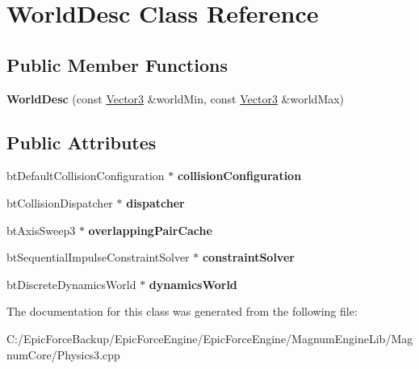 \hypertarget{class_world_desc}{}\section{World\+Desc Class Reference}
\label{class_world_desc}
\subsection*{Public Member Functions}
\begin{DoxyCompactItemize}
\item 
{\bfseries World\+Desc} (const \hyperlink{class_magnum_1_1_vector3}{Vector3} \&world\+Min, const \hyperlink{class_magnum_1_1_vector3}{Vector3} \&world\+Max)\hypertarget{class_world_desc_a2a513c20564b3b07770895d2018c9d57}{}\label{class_world_desc_a2a513c20564b3b07770895d2018c9d57}

\end{DoxyCompactItemize}
\subsection*{Public Attributes}
\begin{DoxyCompactItemize}
\item 
bt\+Default\+Collision\+Configuration $\ast$ {\bfseries collision\+Configuration}\hypertarget{class_world_desc_a180f1ad6c916ab8d14458c84f876592a}{}\label{class_world_desc_a180f1ad6c916ab8d14458c84f876592a}

\item 
bt\+Collision\+Dispatcher $\ast$ {\bfseries dispatcher}\hypertarget{class_world_desc_a680db4ee4aca63042a09913ee3d6252d}{}\label{class_world_desc_a680db4ee4aca63042a09913ee3d6252d}

\item 
bt\+Axis\+Sweep3 $\ast$ {\bfseries overlapping\+Pair\+Cache}\hypertarget{class_world_desc_a84b5dd938eedcef884ca75949b93ebba}{}\label{class_world_desc_a84b5dd938eedcef884ca75949b93ebba}

\item 
bt\+Sequential\+Impulse\+Constraint\+Solver $\ast$ {\bfseries constraint\+Solver}\hypertarget{class_world_desc_aaff4a0c58b8292634b6d8c1779097429}{}\label{class_world_desc_aaff4a0c58b8292634b6d8c1779097429}

\item 
bt\+Discrete\+Dynamics\+World $\ast$ {\bfseries dynamics\+World}\hypertarget{class_world_desc_a28f3a8078b13c87ff1fd1cfeb07be5e5}{}\label{class_world_desc_a28f3a8078b13c87ff1fd1cfeb07be5e5}

\end{DoxyCompactItemize}


The documentation for this class was generated from the following file\+:\begin{DoxyCompactItemize}
\item 
C\+:/\+Epic\+Force\+Backup/\+Epic\+Force\+Engine/\+Epic\+Force\+Engine/\+Magnum\+Engine\+Lib/\+Magnum\+Core/Physics3.\+cpp\end{DoxyCompactItemize}
